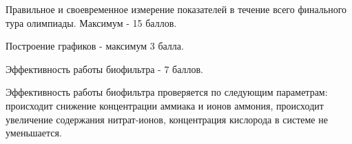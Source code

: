 \markSection 

Правильное и своевременное измерение показателей в течение всего финального тура олимпиады. Максимум - 15 баллов.

Построение графиков - максимум 3 балла.

Эффективность работы биофильтра - 7 баллов.

Эффективность работы биофильтра проверяется по следующим параметрам: происходит снижение концентрации аммиака и ионов аммония, происходит увеличение содержания нитрат-ионов, концентрация кислорода в системе не уменьшается.